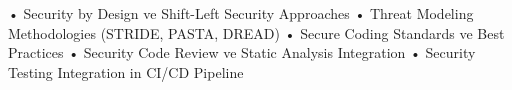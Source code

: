 • Security by Design ve Shift-Left Security Approaches
• Threat Modeling Methodologies (STRIDE, PASTA, DREAD)
• Secure Coding Standards ve Best Practices
• Security Code Review ve Static Analysis Integration
• Security Testing Integration in CI/CD Pipeline